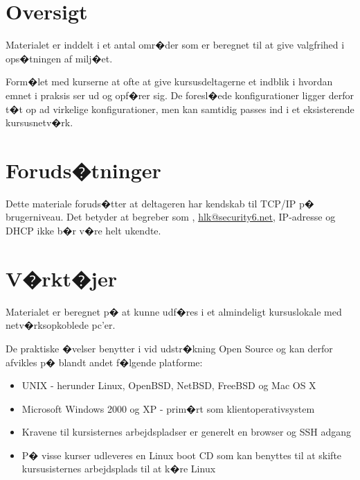 \documentclass[a4paper,11pt,notitlepage]{oevelser}
\begin{document}
\section*{\color{titlecolor}Oversigt}
\setlength{\parskip}{10pt}

Materialet er inddelt i et antal omr�der som er beregnet til at give
valgfrihed i ops�tningen af milj�et.

Form�let med kurserne at ofte at give kursusdeltagerne et indblik i
hvordan emnet i praksis ser ud og opf�rer sig. De foresl�ede
konfigurationer ligger derfor t�t op ad virkelige konfigurationer, men
kan samtidig passes ind i et eksisterende kursusnetv�rk.



\section*{\color{titlecolor}Foruds�tninger}

Dette materiale foruds�tter at deltageren har kendskab til
TCP/IP p� brugerniveau. Det betyder at begreber som
,
\href{mailto:hlk@security6.net}{hlk@security6.net}, IP-adresse og DHCP
ikke b�r v�re helt ukendte.


\section*{\color{titlecolor}V�rkt�jer}

Materialet er beregnet p� at kunne udf�res i et almindeligt
kursuslokale med netv�rksopkoblede pc'er.

De praktiske �velser benytter i vid udstr�kning Open Source og
kan derfor afvikles p� blandt andet f�lgende platforme:
\begin{itemize}
\item UNIX - herunder Linux, OpenBSD, NetBSD, FreeBSD og Mac OS X
\item Microsoft Windows 2000 og XP - prim�rt som
  klientoperativsystem
\item Kravene til kursisternes arbejdspladser er generelt en browser
  og SSH adgang
\item P� visse kurser udleveres en Linux boot CD som kan benyttes til
  at skifte kursusisternes arbejdsplads til at k�re Linux
\end{itemize}
\end{document}

